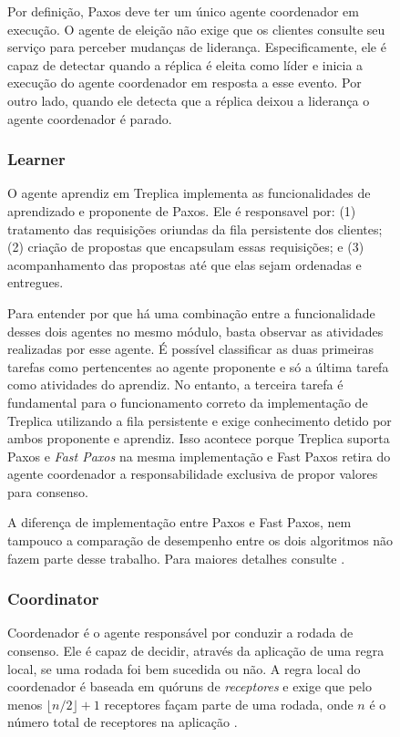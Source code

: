 \begin{figure}[ht]
Por definição, Paxos deve ter um único agente coordenador em execução. O agente de eleição
não exige que os clientes consulte seu serviço para perceber mudanças de liderança.
Especificamente, ele é capaz de detectar quando a réplica é eleita como líder e inicia a
execução do agente coordenador em resposta a esse evento. Por outro lado, quando ele
detecta que a réplica deixou a liderança o agente coordenador é parado.

\subsubsection{Learner}

O agente aprendiz em Treplica implementa as funcionalidades de aprendizado e proponente de
Paxos. Ele é responsavel por: (1) tratamento das requisições oriundas da fila persistente
dos clientes; (2) criação de propostas que encapsulam essas requisições; e (3)
acompanhamento das propostas até que elas sejam ordenadas e entregues.

Para entender por que há uma combinação entre a funcionalidade desses dois agentes no
mesmo módulo, basta observar as atividades realizadas por esse agente. É possível
classificar as duas primeiras tarefas como pertencentes ao agente proponente e só a última
tarefa como atividades do aprendiz. No entanto, a terceira tarefa é fundamental para
o funcionamento correto da implementação de Treplica utilizando a fila persistente e exige
conhecimento detido por ambos proponente e aprendiz. Isso acontece porque Treplica
suporta Paxos e \emph{Fast Paxos} \cite{lamport06a} na mesma implementação e Fast Paxos
retira do agente coordenador a responsabilidade exclusiva de propor valores para consenso.

A diferença de implementação entre Paxos e Fast Paxos, nem tampouco a comparação de
desempenho entre os dois algoritmos não fazem parte desse trabalho. Para maiores detalhes
consulte .

\subsubsection{Coordinator}

Coordenador é o agente responsável por conduzir a rodada de consenso. Ele é capaz de
decidir, através da aplicação de uma regra local, se uma rodada foi bem sucedida ou não. A
regra local do coordenador é baseada em quóruns de \emph{receptores} e exige que pelo
menos $\lfloor n/2 \rfloor + 1$ receptores façam parte de uma rodada, onde $n$ é o número
total de receptores na aplicação \cite{lamport98}.


\end{figure}
